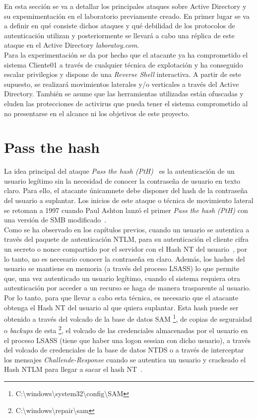 En esta sección se va a detallar los principales ataques sobre Active Directory y su expemimentación en el laboratorio previamente creado. En primer lugar se va a definir en qué consiste dichos ataques y qué debilidad de los protocolos de autenticación utilizan y posteriormente se llevará a cabo una réplica de este ataque en el Active Directory {\it laboratoy.com}. \\

Para la experimentación se da por hecho que el atacante ya ha comprometido el sistema Cliente01 a través de cualquier técnica de explotación y ha conseguido escalar privilegios y dispone de una {\it Reverse Shell} interactiva. A partir de este supuesto, se realizará movimientos laterales y/o verticales a través del Active Directory. También se asume que las herramientas utilizadas están ofuscadas y eluden las protecciones de activirus que pueda tener el sistema comprometido al no presentarse en el alcance ni los objetivos de este proyecto.

\section{Pass the hash}

La idea principal del ataque {\it Pass the hash (PtH)}~\cite{Capitulo5:PtHMitre} es la autenticación de un usuario legítimo sin la necesidad de conocer la contraseña de usuario en texto claro. Para ello, el atacante únicamnete debe disponer del hash de la contraseña del usuario a suplantar. Los inicios de este ataque o técnica de movimiento lateral se retoman a 1997 cuando Paul Ashton lanzó el primer {\it Pass the hash (PtH)} con una versión de SMB modificado~\cite{Capitulo5:Paul}.\\

Como se ha observado en los capítulos previos, cuando un usuario se autentica a través del paquete de autenticación NTLM, para su autenticación el cliente cifra un secreto o nonce compartido por el servidor con el Hash NT del usuario~\cite{Capitulo5:HackingWindows}, por lo tanto, no es necesario conocer la contraseña en claro. Además, los hashes del usuario se mantiene en memoria (a través del proceso LSASS) lo que permite que, una vez autenticado un usuario legítimo, cuando el sistema requiera otra autenticación por acceder a un recurso se haga de manera trasparente al usuario.\\ 

Por lo tanto, para que llevar a cabo esta técnica, es necesario que el atacante obtenga el Hash NT del usuario al que quiera suplantar. Esta hash puede ser obtenido a través del volcado de la base de datos SAM \footnote{C:\textbackslash{}windows\textbackslash{}system32\textbackslash{}config\textbackslash{}SAM}, de copias de seguraidad o {\it backups} de esta \footnote{C:\textbackslash{}windows\textbackslash{}repair\textbackslash{}sam}, el volcado de las credenciales almacenadas por el usuario en el proceso LSASS (tiene que haber una logon sessian con dicho usuario), a través del volcado de credenciales de la base de datos NTDS  o a través de interceptar los mensajes {\it Challende-Response} cuando se autentica un usuario y crackeado el Hash NTLM para llegar a sacar el hash NT~\cite{Capitulo5:PtH}. \\

